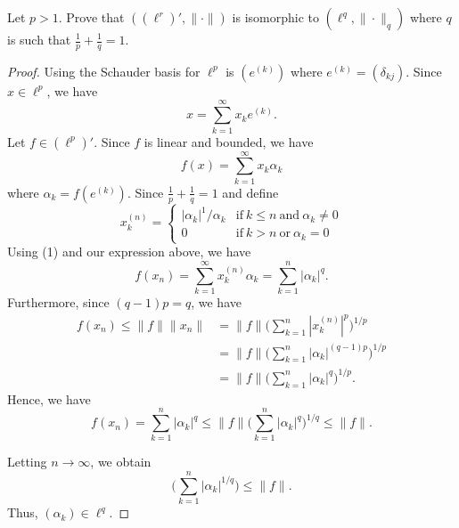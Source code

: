 \documentclass[a4paper]{article}
\begin{document}
\begin{problem}
    Let \( p > 1  \). Prove that \( ((\ell^{r})', \|\cdot\|) \) is isomorphic to \( (\ell^{q}, \|\cdot\|_q) \) where \( q  \) is such that \( \frac{ 1 }{ p  }  + \frac{ 1 }{ q }  = 1  \).
\end{problem}
\begin{proof}
Using the Schauder basis for \( \ell^{p} \) is \( (e^{(k)}) \) where \( e^{(k)} = ({\delta}_{kj}) \). Since \( x \in \ell^{p} \), we have   
\[  x = \sum_{ k=1  }^{ \infty  } {x}_{k} e^{(k)}.   \]
Let \( f \in (\ell^{p})' \). Since \( f  \) is linear and bounded, we have 
\[  f(x) = \sum_{ k=1  }^{ \infty  } {x}_{k} {\alpha}_{k} \tag{1}  \]
where \( {\alpha}_{k} =  f(e^{(k)}) \). Since \( \frac{ 1 }{ p  }  + \frac{ 1 }{ q  }  = 1  \) and define
\[  {x}_{k}^{(n)} = 
\begin{cases}
    | {\alpha}_{k}  |^{1} / {\alpha}_{k} &\text{if} \ k \leq n \ \text{and} \ {\alpha}_{k} \neq 0 \\
    0 &\text{if} \ k > n \ \text{or} \ {\alpha}_{k} = 0 
\end{cases} \]
Using (1) and our expression above, we have 
\[  f({x}_{n}) = \sum_{ k=1  }^{ \infty  } {x}_{k}^{(n)} {\alpha}_{k} = \sum_{ k=1  }^{ n  } | {\alpha}_{k} |^{q}. \]
Furthermore, since \( (q-1)p = q  \), we have 
\begin{align*}
    f({x}_{n}) \leq \|f\| \|{x}_{n}\| &= \|f\| \Big(  \sum_{ k=1  }^{ n  } | {x}_{k}^{(n)}  |^{p} \Big)^{1/p} \\
               &= \|f\| \Big(  \sum_{ k=1  }^{ n  } | {\alpha}_{k} |^{(q-1)p} \Big)^{1/p} \\
               &= \|f\| \Big(  \sum_{ k=1  }^{ n  } | {\alpha}_{k} |^{q} \Big)^{1/p}.
\end{align*}
Hence, we have
\[  f({x}_{n}) = \sum_{ k=1  }^{ n } | {\alpha}_{k} |^{q} \leq \|f \| \Big(  \sum_{ k=1  }^{ n } | {\alpha}_{k} |^{q} \Big)^{1/q} \leq \|f\|. \]

Letting \( n \to \infty   \), we obtain 
\[  \Big(  \sum_{ k=1  }^{ n } | {\alpha}_{k} |^{1/q} \Big) \leq \|f\|. \tag{*} \]
Thus, \( ({\alpha}_{k}) \in \ell^{q} \). 


\end{proof}
\end{document}
